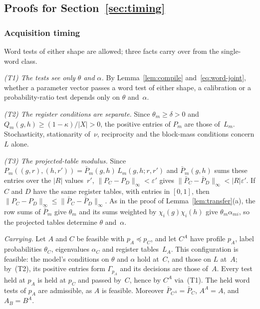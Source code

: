 
\subsection{Proofs for Section~\ref{sec:timing}}\label{app:timing-proofs}

\subsubsection{Acquisition timing}\label{app:acquisition-proofs}

Word tests of either shape are allowed; three facts carry over from the
single-word class.

\emph{(T1) The tests see only $\theta$ and $\alpha$.} By
Lemma~\ref{lem:compile} and~\eqref{eq:word-joint}, whether a parameter
vector passes a word test of either shape, a calibration or a
probability-ratio test depends only on $\theta$ and~$\alpha$.

\emph{(T2) The register conditions are separate.} Since $\theta_m\ge\delta>0$
and $Q_m(g,h)\ge(1-\kappa)/|X|>0$, the positive entries of $P_m$ are those
of~$L_m$. Stochasticity, stationarity of~$\nu$, reciprocity and the
block-mass conditions concern $L$ alone.

\emph{(T3) The projected-table modulus.} Since
$P_m((g,r),(h,r'))=\bar P_m(g,h)\,L_m(g,h;r,r')$ and $\bar P_m(g,h)$ sums
these entries over the $|R|$ values~$r'$,
$\|P_C-P_D\|_\infty<\varepsilon'$ gives
$\|\bar P_C-\bar P_D\|_\infty<|R|\varepsilon'$. If $C$ and $D$ have the same
register tables, with entries in $[0,1]$, then
$\|P_C-P_D\|_\infty\le\|\bar P_C-\bar P_D\|_\infty$. As in the proof of
Lemma~\ref{lem:transfer}(a), the row sums of $\bar P_m$ give $\theta_m$
and its sums weighted by $\chi_i(g)\chi_i(h)$ give $\theta_m\alpha_{mi}$,
so the projected tables determine $\theta$ and~$\alpha$.

\emph{Carrying.} Let $A$ and $C$ be feasible with $p_A\preceq p_C$, and
let $C^A$ have profile $p_A$, label probabilities $\theta_C$, eigenvalues
$\alpha_C$ and register tables~$L_A$. This configuration is feasible: the
model's conditions on $\theta$ and $\alpha$ hold at~$C$, and those on $L$
at~$A$; by~(T2), its positive entries form $\Gamma_{p_A}$ and its
decisions are those of~$A$. Every test held at $p_A$ is held at $p_C$ and
passed by~$C$, hence by $C^A$ via~(T1). The held word tests of $p_A$ are
admissible, as $A$ is feasible. Moreover $\bar P_{C^A}=\bar P_C$, $A^A=A$,
and $A_B=B^A$.

